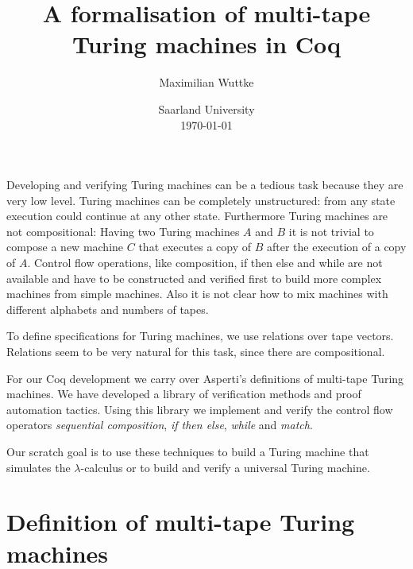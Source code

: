 \documentclass{psartcl}
\begin{document}
\title{A formalisation of multi-tape \\ Turing machines in Coq}
\author{Maximilian Wuttke}
\date{Saarland University\\\today}
\maketitle

\begin{abstract}
  \noindent
\end{abstract}

Developing and verifying Turing machines can be a tedious task because they are very low level.  Turing machines can be completely unstructured: from
any state execution could continue at any other state.  Furthermore Turing machines are not compositional:  Having two Turing machines $A$ and $B$ it
is not trivial to compose a new machine $C$ that executes a copy of $B$ after the execution of a copy of $A$.  Control flow operations, like
composition, if then else and while are not available and have to be constructed and verified first to build more complex machines from simple
machines.  Also it is not clear how to mix machines with different alphabets and numbers of tapes.

To define specifications for Turing machines, we use relations over tape vectors.  Relations seem to be very natural for this task, since there are
compositional.

For our Coq development we carry over Asperti's \cite{Asperti} definitions of multi-tape Turing machines.  We have developed a library of verification
methods and proof automation tactics.  Using this library we implement and verify the control flow operators \emph{sequential composition}, \emph{if
then else}, \emph{while} and \emph{match}.

Our scratch goal is to use these techniques to build a Turing machine that simulates the $\lambda$-calculus or to build and verify a universal Turing
machine.

\section{Definition of multi-tape Turing machines}
\label{sec:def}
\end{document}
